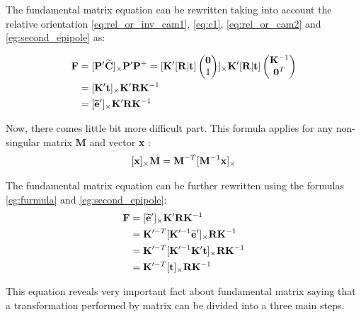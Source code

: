 \documentclass[a4paper,12pt]{article}
\newcommand{\ematr}[1]{%
{\bf #1}%
}
\newcommand{\evect}[1]{%
{\bf #1}%
}
\newcommand{\ehvect}[1]{%
{\bf \widetilde{#1}}%
}
\begin{document}
The fundamental matrix equation can be rewritten taking into account the relative orientation \eqref{eq:rel_or_inv_cam1},
 \eqref{eq:c1}, \eqref{eq:rel_or_cam2} and \eqref{eg:second_epipole}   as:

\begin{equation}
\label{eg:funeq}
\begin{split}
\ematr{F}  &= [\ematr{P}'\ehvect{C}]_{\times} \ematr{P}'\ematr{P}^{+}
= [\ematr{K}' [\ematr{R}|\evect{t}]
\begin{pmatrix}
   \evect{0} \\
    1 \\
\end{pmatrix}]
_{\times} 
\ematr{K}' [\ematr{R}|\evect{t}]  
\begin{pmatrix}
   \evect{K}^{-1} \\
   \evect{0}^{T} \\
\end{pmatrix} \\
&= [\ematr{K}' \evect{t}]_{\times} \ematr{K}'\ematr{R}\ematr{K}^{-1} \\
&= [\ehvect{e}']_{\times} \ematr{K}'\ematr{R}\ematr{K}^{-1} 
\end{split}
\end{equation}

Now, there comes little bit more difficult part.
This formula applies for any non-singular matrix \ematr{M} and vector \evect{x} \cite[p. 582]{Hartley2004}:
\begin{equation}
\label{eg:furmula}
[\evect{x}]_{\times} \ematr{M} = \ematr{M}^{-T}[\ematr{M}^{-1}\evect{x}]_{\times}
\end{equation}

The fundamental matrix equation can be further rewritten using the formulas \eqref{eg:furmula} and \eqref{eg:second_epipole}:  
\begin{equation}
\begin{split}
\ematr{F}  &= [\ehvect{e}']_{\times} \ematr{K}' \ematr{R} \ematr{K}^{-1} \\
	  &= \ematr{K}'^{-T} [\ematr{K}'^{-1} \ehvect{e}']_{\times} \ematr{R} \ematr{K}^{-1} \\
	   &= \ematr{K}'^{-T} [\ematr{K}'^{-1} \ematr{K}' \evect{t}]_{\times} \ematr{R} \ematr{K}^{-1} \\
	   &= \ematr{K}'^{-T} [\evect{t}]_{\times} \ematr{R} \ematr{K}^{-1}
\end{split}
\end{equation}

This equation reveals very important fact about fundamental matrix saying that a transformation performed 
by matrix can be divided into a three main steps.
\end{document}
